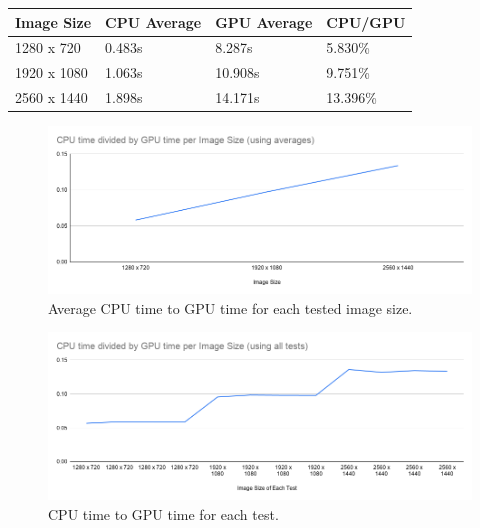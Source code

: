 \documentclass[conference]{IEEEtran}
\begin{document}
\begin{table}[h]
    \begin{tabular}{|l|l|l|l|}
        \hline
Image Size & CPU Average & GPU Average & CPU/GPU \\ \hline
1280 x 720 & 0.483s & 8.287s & 5.830\%\\ \hline
1920 x 1080 & 1.063s & 10.908s & 9.751\%\\ \hline
2560 x 1440 & 1.898s & 14.171s & 13.396\%\\ \hline
    \end{tabular}
\end{table}

\begin{figure}[h!]
    \includegraphics[width=\linewidth]{CPU time divided by GPU time per Image Size (using averages).png}
    \caption{Average CPU time to GPU time for each tested image size.}
    \label{fig:Performance of Original Pencil Drawing Program}
\end{figure}
\begin{figure}[h!]
    \includegraphics[width=\linewidth]{CPU time divided by GPU time per Image Size (using all tests).png}
    \caption{CPU time to GPU time for each test.}
    \label{fig:Performance of Original Pencil Drawing Program}
\end{figure}
\end{document}
